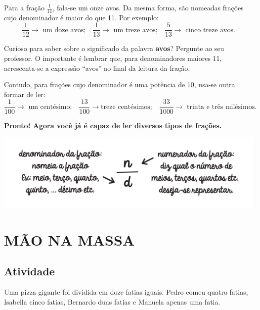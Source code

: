 Para a fração $\frac{1}{11}$, fala-se um onze avos. Da mesma forma, são nomeadas frações cujo denominador é maior do que 11. Por exemplo:
$$\frac{1}{12}\rightarrow \text{  um doze avos;}\quad \frac{1}{13}\rightarrow \text{ um treze avos;} \quad \frac{5}{13}\rightarrow \text{ cinco treze avos.}$$

Curioso para saber sobre o significado da palavra {\bf avos}? Pergunte ao seu professor. O importante é lembrar que, para denominadores maiores 11, acrescenta-se a expressão ``avos'' ao final da leitura da fração.

Contudo, para frações cujo denominador é uma potência de 10, usa-se outra formar de ler:
$$\frac{1}{100}\rightarrow \text{ um centésimo;}\quad \frac{13}{100} \rightarrow \text{treze centésimos;} \quad
\frac{33}{1000}\rightarrow \text{ trinta e três milésimos.}$$

{\bf Pronto! Agora você já é capaz de ler diversos tipos de frações.}

\begin{center}
 \includegraphics[width=.9\textwidth, keepaspectratio]{..//media/cap2/secoes/pngs_licao_02/orgideias_fig01.png} 
\end{center}


\section{MÃO NA MASSA }

\subsection{Atividade}

Uma pizza gigante foi dividida em doze fatias iguais. 
Pedro comeu quatro fatias, Isabella cinco fatias, Bernardo duas fatias e Manuela apenas uma fatia.

